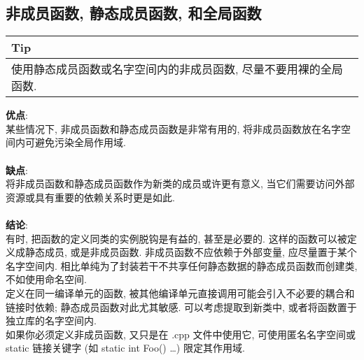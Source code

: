 \documentclass[a4paper,11pt,CJK]{article}
\begin{document}
\begin{CJK}{UTF8}{gbsn}
\subsection{非成员函数, 静态成员函数, 和全局函数}
\begin{table}[htbp]
\flushleft
\begin{tabular}{p{400pt}}
\toprule
\rowcolor[gray]{.8} Tip \\
\midrule
使用静态成员函数或名字空间内的非成员函数, 尽量不要用裸的全局函数.\\
\bottomrule
\end{tabular}
\end{table}
\noindent
\textbf{优点}:\\
\indent 某些情况下, 非成员函数和静态成员函数是非常有用的, 将非成员函数放在名字空间内可避免污染全局作用域.\\
\\
\textbf{缺点}:\\
\indent 将非成员函数和静态成员函数作为新类的成员或许更有意义, 当它们需要访问外部资源或具有重要的依赖关系时更是如此.\\
\\
\textbf{结论}:\\
\indent 有时, 把函数的定义同类的实例脱钩是有益的, 甚至是必要的. 这样的函数可以被定义成静态成员, 或是非成员函数. 非成员函数不应依赖于外部变量, 应尽量置于某个名字空间内. 相比单纯为了封装若干不共享任何静态数据的静态成员函数而创建类, 不如使用命名空间.\\

\indent 定义在同一编译单元的函数, 被其他编译单元直接调用可能会引入不必要的耦合和链接时依赖; 静态成员函数对此尤其敏感. 可以考虑提取到新类中, 或者将函数置于独立库的名字空间内.\\

\indent 如果你必须定义非成员函数, 又只是在 .cpp 文件中使用它, 可使用匿名名字空间或 static 链接关键字 (如 static int Foo() {\dots}) 限定其作用域.\\


\end{CJK}
\end{document}
